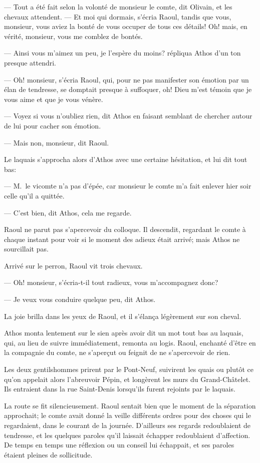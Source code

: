 — Tout a été fait selon la volonté de monsieur le comte, dit Olivain, et les chevaux attendent.
— Et moi qui dormais, s'écria Raoul, tandis que vous, monsieur, vous aviez la bonté de vous occuper de tous ces détails! Oh! mais, en vérité, monsieur, vous me comblez de bontés.

— Ainsi vous m'aimez un peu, je l'espère du moins? répliqua Athos d'un ton presque attendri.

— Oh! monsieur, s'écria Raoul, qui, pour ne pas manifester son émotion par un élan de tendresse, se domptait presque à suffoquer, oh! Dieu m'est témoin que je vous aime et que je vous vénère.

— Voyez si vous n'oubliez rien, dit Athos en faisant semblant de chercher autour de lui pour cacher son émotion.

— Mais non, monsieur, dit Raoul.

Le laquais s'approcha alors d'Athos avec une certaine hésitation, et lui dit tout bas:

— M.~le vicomte n'a pas d'épée, car monsieur le comte m'a fait enlever hier soir celle qu'il a quittée.

— C'est bien, dit Athos, cela me regarde.

Raoul ne parut pas s'apercevoir du colloque. Il descendit, regardant le comte à chaque instant pour voir si le moment des adieux était arrivé; mais Athos ne sourcillait pas.

Arrivé sur le perron, Raoul vit trois chevaux.

— Oh! monsieur, s'écria-t-il tout radieux, vous m'accompagnez donc?

— Je veux vous conduire quelque peu, dit Athos.

La joie brilla dans les yeux de Raoul, et il s'élança légèrement sur son cheval.

Athos monta lentement sur le sien après avoir dit un mot tout bas au laquais, qui, au lieu de suivre immédiatement, remonta au logis. Raoul, enchanté d'être en la compagnie du comte, ne s'aperçut ou feignit de ne s'apercevoir de rien.

Les deux gentilshommes prirent par le Pont-Neuf, suivirent les quais ou plutôt ce qu'on appelait alors l'abreuvoir Pépin, et longèrent les murs du Grand-Châtelet. Ils entraient dans la rue Saint-Denis lorsqu'ils furent rejoints par le laquais.

La route se fit silencieusement. Raoul sentait bien que le moment de la séparation approchait; le comte avait donné la veille différents ordres pour des choses qui le regardaient, dans le courant de la journée. D'ailleurs ses regards redoublaient de tendresse, et les quelques paroles qu'il laissait échapper redoublaient d'affection. De temps en temps une réflexion ou un conseil lui échappait, et ses paroles étaient pleines de sollicitude.

